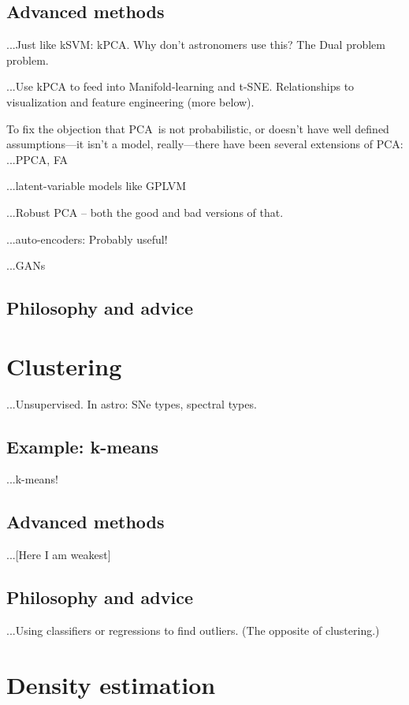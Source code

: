 \documentclass[12pt, twoside, letterpaper]{article}
\newcommand{\acronym}[1]{{\small{#1}}}
\newcommand{\PCA}{\acronym{PCA}}
\begin{document}
\subsection{Advanced methods}

...Just like kSVM: kPCA. Why don't astronomers use this? The Dual problem problem.

...Use kPCA to feed into Manifold-learning and t-SNE.
Relationships to visualization and feature engineering (more below).

To fix the objection that \PCA\ is not probabilistic, or doesn't have well
defined assumptions---it isn't a model, really---there have been several
extensions of \PCA:
...PPCA, FA

...latent-variable models like GPLVM

...Robust PCA -- both the good and bad versions of that.

...auto-encoders: Probably useful!

...GANs

\subsection{Philosophy and advice}

\section{Clustering}

...Unsupervised. In astro: SNe types, spectral types.

\subsection{Example: k-means}

...k-means!

\subsection{Advanced methods}

...[Here I am weakest]

\subsection{Philosophy and advice}

...Using classifiers or regressions to find outliers. (The opposite of clustering.)

\section{Density estimation}
\end{document}
